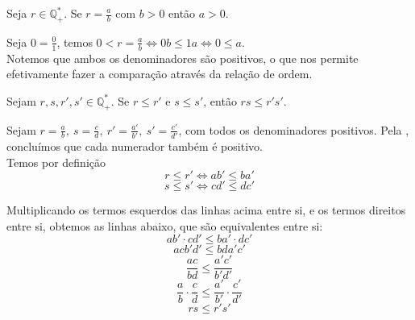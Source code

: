\documentclass[../main.tex]{subfiles}
\begin{document}
\begin{prop}\label{rac-prop-numeradorPositivo}
    Seja $r \in \mathbb{Q}_{+}^*$. Se $r = \frac{a}{b}$ com $b > 0$ então $a > 0$.
\end{prop}
\begin{dem}
    Seja $0 = \frac{0}{1}$, temos $0 < r = \frac{a}{b} \iff 0b \leq 1a \iff 0 \leq a$. \\
    Notemos que ambos os denominadores são positivos, o que nos permite efetivamente fazer a comparação através da relação de ordem.
\end{dem}

\begin{prop}\label{rac-prop-produtoMaioresMaior}
    Sejam $r,s,r',s' \in \mathbb{Q}_{+}^*$. Se $r \leq r'$ e $s \leq s'$, então $rs \leq r's'$.
\end{prop}
\begin{dem}
    Sejam $r = \frac{a}{b},\ s = \frac{c}{d},\ r' = \frac{a'}{b'},\ s' = \frac{c'}{d'}$, com todos os denominadores positivos. Pela , concluímos que cada numerador também é positivo. \\
    Temos por definição
    \[ r \leq r' \iff ab' \leq ba' \]
    \[ s \leq s' \iff cd' \leq dc' \]

    Multiplicando os termos esquerdos das linhas acima entre si, e os termos direitos entre si, obtemos as linhas abaixo, que são equivalentes entre si:
    \[ ab' \cdot cd' \leq ba' \cdot dc' \]
    \[ acb'd' \leq bda'c' \]
    \[ \frac{ac}{bd} \leq \frac{a'c'}{b'd'} \]
    \[ \frac{a}{b} \cdot \frac{c}{d} \leq \frac{a'}{b'} \cdot \frac{c'}{d'} \]
    \[ rs \leq r's' \]
    
        
\end{dem}
\end{document}
